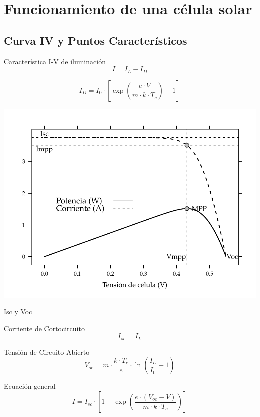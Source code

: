 \documentclass[xcolor={usenames,svgnames,dvipsnames}]{beamer}
\begin{document}
\section{Funcionamiento de una célula solar}
\label{sec:org98bbd2e}

\subsection{Curva IV y Puntos Característicos}
\label{sec:orgf2b7a1c}
\begin{frame}[label={sec:org32b26f2}]{Característica I-V de iluminación}
$$I=I_{L}-I_{D}$$

$$I_{D}=I_{0}\cdot\left[\exp\left(\frac{e\cdot V}{m\cdot k\cdot
      T_{c}}\right)-1\right]$$

\begin{center}
\includegraphics[width=.9\linewidth]{../figs/CurvaIV_Ta20_G800.pdf}
\end{center}
\end{frame}

\begin{frame}[label={sec:org48cbdda}]{Isc y Voc}
\begin{block}{Corriente de Cortocircuito}
\[
I_{sc}=I_L
\]
\end{block}
\begin{block}{Tensión de Circuito Abierto}
\[
V_{oc}=m \cdot \frac{k \cdot T_{c}}{e}\cdot\ln\left(\frac{I_{L}}{I_{0}}+1\right)
\]
\end{block}
\begin{block}{Ecuación general}
\[
I = I_{sc} \cdot \left[1-\exp\left(\frac{e \cdot (V_{oc}-V)}{m \cdot k \cdot T_{c}}\right)\right]
\]
\end{block}
\end{frame}
\end{document}
